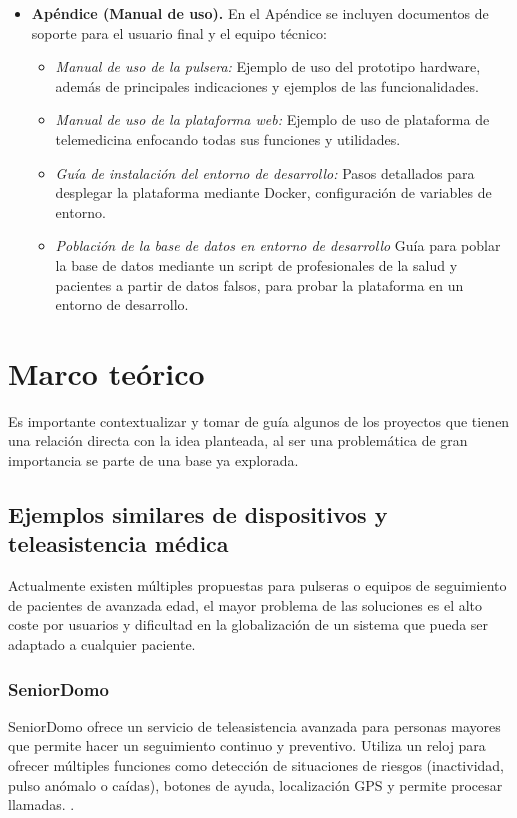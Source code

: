 \documentclass[12pt, a4paper]{article}
\begin{document}
\begin{itemize}
		\item \textbf{Apéndice (Manual de uso).}  
		En el Apéndice se incluyen documentos de soporte para el usuario final y el equipo técnico:
		\begin{itemize}
			\item \emph{Manual de uso de la pulsera:} Ejemplo de uso del prototipo hardware, además de principales indicaciones y ejemplos de las funcionalidades.  
			\item \emph{Manual de uso de la plataforma web:} Ejemplo de uso de plataforma de telemedicina enfocando todas sus funciones y utilidades. 
			\item \emph{Guía de instalación del entorno de desarrollo:} Pasos detallados para desplegar la plataforma mediante Docker, configuración de variables de entorno.
			\item \emph{Población de la base de datos en entorno de desarrollo} Guía para poblar la base de datos mediante un script de profesionales de la salud y pacientes a partir de datos falsos, para probar la plataforma en un entorno de desarrollo.
		\end{itemize}
	\end{itemize}
	

\section{Marco teórico}

	Es importante contextualizar y tomar de guía algunos de los proyectos que tienen una relación directa con la idea planteada, al ser una problemática de gran importancia se parte de una base ya explorada.

	\subsection{Ejemplos similares de dispositivos y teleasistencia médica}
	
	Actualmente existen múltiples propuestas para pulseras o equipos de seguimiento de pacientes de avanzada edad, el mayor problema de las soluciones es el alto coste por usuarios y dificultad en la globalización de un sistema que pueda ser adaptado a cualquier paciente.
	
	\subsubsection{SeniorDomo}
	
	SeniorDomo ofrece un servicio de teleasistencia avanzada para personas mayores que permite hacer un seguimiento continuo y preventivo. Utiliza un reloj para ofrecer múltiples funciones como detección de situaciones de riesgos (inactividad, pulso anómalo o caídas), botones de ayuda, localización GPS y permite procesar llamadas.  \cite{seniordomo}.
	
\end{document}
